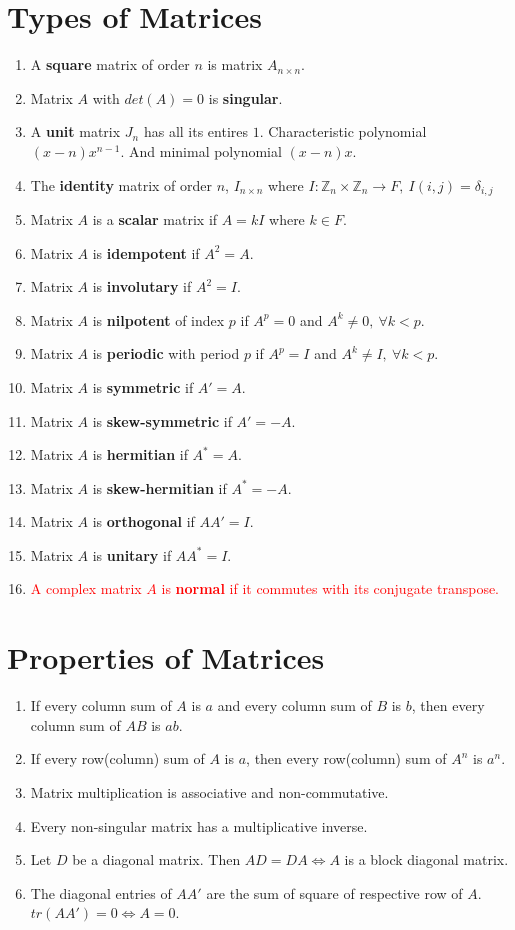 \section{Types of Matrices}
\begin{enumerate}
	\item A \textbf{square} matrix of order $n$ is matrix $A_{n \times n}$.
	\item Matrix $A$ with $det(A) = 0$ is \textbf{singular}.
	\item A \textbf{unit} matrix $J_n$ has all its entires $1$.
		\subitem Characteristic polynomial $(x-n)x^{n-1}$. And minimal polynomial $(x-n)x$.
	\item The \textbf{identity} matrix of order $n$, $I_{n \times n}$ where $I : \mathbb{Z}_n \times \mathbb{Z}_n \to F,\ I(i,j) = \delta_{i,j}$
	\item Matrix $A$ is a \textbf{scalar} matrix if $A = kI$ where $k \in F$.
	\item Matrix $A$ is \textbf{idempotent} if $A^2 = A$.
	\item Matrix $A$ is \textbf{involutary} if $A^2 = I$.
	\item Matrix $A$ is \textbf{nilpotent} of index $p$ if $A^p = 0$ and $A^k \ne 0,\ \forall k < p$.
	\item Matrix $A$ is \textbf{periodic} with period $p$ if $A^p = I$ and $A^k \ne I,\ \forall k < p$.
	\item Matrix $A$ is \textbf{symmetric} if $A'=A$.
	\item Matrix $A$ is \textbf{skew-symmetric} if $A'=-A$.
	\item Matrix $A$ is \textbf{hermitian} if $A^\ast = A$.
	\item Matrix $A$ is \textbf{skew-hermitian} if $A^\ast = -A$.
	\item Matrix $A$ is \textbf{orthogonal} if $AA' = I$.
	\item Matrix $A$ is \textbf{unitary} if $AA^\ast = I$.
	\item \textcolor{red}{A complex matrix $A$ is \textbf{normal} if it commutes with its conjugate transpose.}
\end{enumerate}

\section{Properties of Matrices}
\begin{enumerate}
	\item If every column sum of $A$ is $a$ and every column sum of $B$ is $b$, then every column sum of $AB$ is $ab$.
	\item If every row(column) sum of $A$ is $a$, then every row(column) sum of $A^n$ is $a^n$.
	\item Matrix multiplication is associative and non-commutative.
	\item Every non-singular matrix has a multiplicative inverse.
	\item Let $D$ be a diagonal matrix.
	Then $AD = DA \iff A$ is a block diagonal matrix.
	\item The diagonal entries of $AA'$ are the sum of square of respective row of $A$.
		\subitem $tr(AA') = 0 \iff A = 0$.
\end{enumerate}


